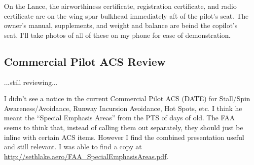 On the Lance, the airworthiness certificate, registration certificate, and radio certificate are on the wing spar bulkhead immediately aft of the pilot's seat. The owner's manual, supplements, and weight and balance are beind the copilot's seat. I'll take photos of all of these on my phone for ease of demonstration.

\subsection{Commercial Pilot ACS Review}

...still reviewing...

I didn't see a notice in the current Commercial Pilot ACS (DATE) for Stall/Spin Awareness/Avoidance, Runway Incursion Avoidance, Hot Spots, etc. I think he meant the ``Special Emphasis Areas'' from the PTS of days of old. The FAA seems to think that, instead of calling them out separately, they should just be inline with certain ACS items. However I find the combined presentation useful and still relevant. I was able to find a copy at \url{http://sethlake.aero/FAA_SpecialEmphasisAreas.pdf}.


